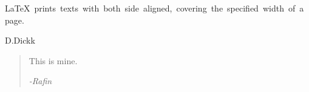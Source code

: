 \documentclass[12pt,a4paper]{article}
\begin{document}
\mbox{\LaTeX\ prints texts with both side aligned, covering the specified width of a page.}

D.Dickk

\begin{quotation}
    This is mine.
    \begin{flushright}
        \textit{-Rafin}
    \end{flushright}
\end{quotation}
\end{document}
